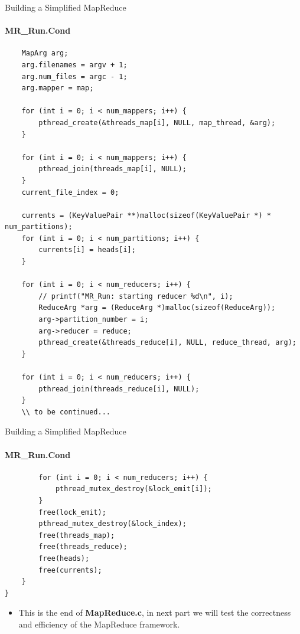 \documentclass[10pt]{beamer}
\begin{document}
\begin{frame}[fragile]{Building a Simplified MapReduce}
    \framesubtitle{MR\_Run.Cond}
    \begin{lstlisting}
    MapArg arg;
    arg.filenames = argv + 1;
    arg.num_files = argc - 1;
    arg.mapper = map;

    for (int i = 0; i < num_mappers; i++) {
        pthread_create(&threads_map[i], NULL, map_thread, &arg);
    }

    for (int i = 0; i < num_mappers; i++) {
        pthread_join(threads_map[i], NULL);
    }
    current_file_index = 0;

    currents = (KeyValuePair **)malloc(sizeof(KeyValuePair *) * num_partitions);
    for (int i = 0; i < num_partitions; i++) {
        currents[i] = heads[i];
    }

    for (int i = 0; i < num_reducers; i++) {
        // printf("MR_Run: starting reducer %d\n", i);
        ReduceArg *arg = (ReduceArg *)malloc(sizeof(ReduceArg));
        arg->partition_number = i;
        arg->reducer = reduce;
        pthread_create(&threads_reduce[i], NULL, reduce_thread, arg);
    }

    for (int i = 0; i < num_reducers; i++) {
        pthread_join(threads_reduce[i], NULL);
    }
    \\ to be continued...
\end{lstlisting}
\end{frame}

\begin{frame}[fragile]{Building a Simplified MapReduce}
    \framesubtitle{MR\_Run.Cond}
    \begin{lstlisting}
        for (int i = 0; i < num_reducers; i++) {
            pthread_mutex_destroy(&lock_emit[i]);
        }
        free(lock_emit);
        pthread_mutex_destroy(&lock_index);
        free(threads_map);
        free(threads_reduce);
        free(heads);
        free(currents);
    }
}
\end{lstlisting}
    \begin{itemize}
        \item This is the end of \textbf{MapReduce.c}, in next part we will test the correctness and efficiency of the MapReduce framework.
    \end{itemize}
\end{frame}
\end{document}
